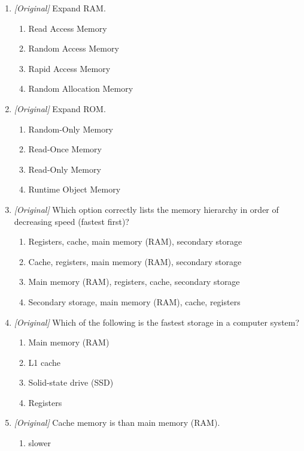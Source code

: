 \begin{enumerate}[label=\textbf{Q\arabic*.}, leftmargin=*]
\item \textit{[Original]} Expand RAM.
  \begin{enumerate}[label=\Alph*.]
    \item Read Access Memory
    \item Random Access Memory
    \item Rapid Access Memory
    \item Random Allocation Memory
  \end{enumerate}
\item \textit{[Original]} Expand ROM.
  \begin{enumerate}[label=\Alph*.]
    \item Random-Only Memory
    \item Read-Once Memory
    \item Read-Only Memory
    \item Runtime Object Memory
  \end{enumerate}
\item \textit{[Original]} Which option correctly lists the memory hierarchy
  in order of decreasing speed (fastest first)?
  \begin{enumerate}[label=\Alph*.]
    \item Registers, cache, main memory (RAM), secondary storage
    \item Cache, registers, main memory (RAM), secondary storage
    \item Main memory (RAM), registers, cache, secondary storage
    \item Secondary storage, main memory (RAM), cache, registers
  \end{enumerate}
\item \textit{[Original]} Which of the following is the fastest storage in a
  computer system?
  \begin{enumerate}[label=\Alph*.]
    \item Main memory (RAM)
    \item L1 cache
    \item Solid-state drive (SSD)
    \item Registers
  \end{enumerate}
\item \textit{[Original]} Cache memory is \underline{\hspace{2.2cm}} than
  main memory (RAM).
  \begin{enumerate}[label=\Alph*.]
    \item slower

\end{enumerate}
\end{enumerate}
